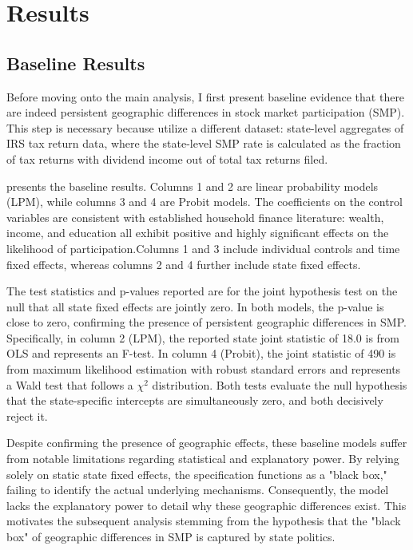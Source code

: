 
\section{Results}
\label{sec:results}

\subsection{Baseline Results}
Before moving onto the main analysis, I first present baseline evidence that there are indeed persistent geographic differences in stock market participation (SMP). This step is necessary because \citet{chien2017} utilize a different dataset: state-level aggregates of IRS tax return data, where the state-level SMP rate is calculated as the fraction of tax returns with dividend income out of total tax returns filed.

 presents the baseline results. Columns 1 and 2 are linear probability models (LPM), while columns 3 and 4 are Probit models. The coefficients on the control variables are consistent with established household finance literature: wealth, income, and education all exhibit positive and highly significant effects on the likelihood of participation.Columns 1 and 3 include individual controls and time fixed effects, whereas columns 2 and 4 further include state fixed effects. 

The test statistics and p-values reported are for the joint hypothesis test on the null that all state fixed effects are jointly zero. In both models, the p-value is close to zero, confirming the presence of persistent geographic differences in SMP. Specifically, in column 2 (LPM), the reported state joint statistic of 18.0 is from OLS and represents an F-test. In column 4 (Probit), the joint statistic of 490 is from maximum likelihood estimation with robust standard errors and represents a Wald test that follows a $\chi^2$ distribution. Both tests evaluate the null hypothesis that the state-specific intercepts are simultaneously zero, and both decisively reject it.

Despite confirming the presence of geographic effects, these baseline models suffer from notable limitations regarding statistical and explanatory power. By relying solely on static state fixed effects, the specification functions as a "black box," failing to identify the actual underlying mechanisms. Consequently, the model lacks the explanatory power to detail why these geographic differences exist. This motivates the subsequent analysis stemming from the hypothesis that the "black box" of geographic differences in SMP is captured by state politics. 



